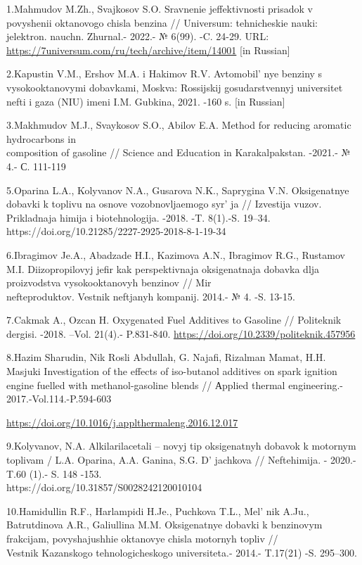 \begin{references}
1.Mahmudov M.Zh., Svajkosov S.O. Sravnenie jeffektivnosti prisadok v
povyshenii oktanovogo chisla benzina // Universum: tehnicheskie nauki:
jelektron. nauchn. Zhurnal.- 2022.- № 6(99). -C. 24-29. URL:
\url{https://7universum.com/ru/tech/archive/item/14001} {[}in Russian{]}

2.Kapustin V.M., Ershov M.A. i Hakimov R.V.
Avtomobil' nye benziny s vysokooktanovymi dobavkami,
Moskva: Rossijskij gosudarstvennyj universitet nefti i gaza (NIU) imeni
I.M. Gubkina, 2021. -160 s. {[}in Russian{]}

3.Makhmudov M.J., Svaykosov S.O., Abilov E.A. Method for reducing
aromatic hydrocarbons in \\composition of gasoline // Science and
Education in Karakalpakstan. -2021.- № 4.- С. 111-119

5.Oparina L.A., Kolyvanov N.A., Gusarova N.K., Saprygina V.N.
Oksigenatnye dobavki k toplivu na osnove vozobnovljaemogo
syr' ja // Izvestija vuzov. Prikladnaja himija i
biotehnologija. -2018. -T. 8(1).-S. 19--34.
https://doi.org/10.21285/2227-2925-2018-8-1-19-34

6.Ibragimov Je.A., Abadzade H.I., Kazimova A.N., Ibragimov R.G.,
Rustamov M.I. Diizopropilovyj jefir kak perspektivnaja oksigenatnaja
dobavka dlja proizvodstva vysokooktanovyh benzinov // Mir
\\nefteproduktov. Vestnik neftjanyh kompanij. 2014.- № 4. -S. 13-15.

7.Cakmak A., Ozcan H. Oxygenated Fuel Additives to Gasoline //
Politeknik dergisi. -2018. --Vol. 21(4).- P.831-840.
\url{https://doi.org/10.2339/politeknik.457956}

8.Hazim Sharudin, Nik Rosli Abdullah, G. Najafi, Rizalman Mamat, H.H.
Masjuki Investigation of the effects of iso-butanol additives on spark
ignition engine fuelled with methanol-gasoline blends // Аpplied thermal
engineering.- 2017.-Vol.114.-P.594-603

\url{https://doi.org/10.1016/j.applthermaleng.2016.12.017}

9.Kolyvanov, N.A. Alkilarilacetali -- novyj tip oksigenatnyh dobavok k
motornym toplivam / L.A. Oparina, A.A. Ganina, S.G.
D' jachkova // Neftehimija. - 2020.- T.60 (1).- S. 148
-153. \\https://doi.org/10.31857/S0028242120010104

10.Hamidullin R.F., Harlampidi H.Je., Puchkova T.L.,
Mel' nik A.Ju., Batrutdinova A.R., Galiullina M.M.
Oksigenatnye dobavki k benzinovym frakcijam, povyshajushhie oktanovye
chisla motornyh topliv // \\Vestnik Kazanskogo tehnologicheskogo
universiteta.- 2014.- T.17(21) -S. 295--300.


\end{references}
